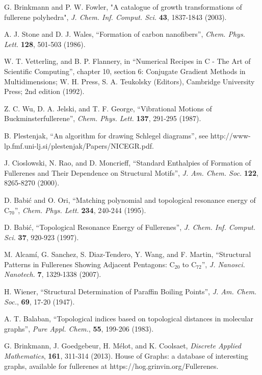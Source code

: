 \documentclass[article,a4paper,twoside]{memoir}
\newcommand{\C}[1]{\ensuremath{\mathrm{C}_{#1}}}
\begin{document}
\begin{thebibliography}{99}
 G. Brinkmann and P. W. Fowler, "A catalogue of growth transformations of fullerene polyhedra",
\textit{J. Chem. Inf. Comput. Sci.} \textbf{43}, 1837-1843 (2003).

 A. J. Stone and D. J. Wales, ``Formation of carbon nanofibers'', \textit{Chem. Phys. Lett.} \textbf{128}, 501-503 (1986).

 W. T. Vetterling, and B. P. Flannery, in ``Numerical Recipes in C - The Art of Scientific Computing'', chapter 10, section 6: Conjugate Gradient Methods in Multidimensions; W. H. Press, S. A. Teukolsky (Editors), Cambridge University Press; 2nd edition (1992).

 Z. C. Wu, D. A. Jelski, and T. F. George, ``Vibrational Motions of
Buckminsterfullerene'', \textit{Chem. Phys. Lett.} \textbf{137}, 291-295 (1987).

 B. Plestenjak, ``An algorithm for drawing Schlegel diagrams'', see http://www-lp.fmf.uni-lj.si/plestenjak/Papers/NICEGR.pdf.

 J. Cioslowski, N. Rao, and D. Moncrieff, ``Standard Enthalpies of Formation of Fullerenes and Their
Dependence on Structural Motifs'', \textit{J. Am. Chem. Soc.} \textbf{122}, 8265-8270 (2000).

 D. Babi\'c and O. Ori, ``Matching polynomial and topological resonance energy of \C{70}'', \textit{Chem. Phys. Lett.} \textbf{234}, 240-244 (1995).

 D. Babi\'c, ``Topological Resonance Energy of Fullerenes'', \textit{J. Chem. Inf. Comput. Sci.} \textbf{37}, 920-923 (1997).

 M. Alcam\'i, G. Sanchez, S. Diaz-Tendero, Y. Wang, and F. Martin, ``Structural Patterns in Fullerenes Showing
Adjacent Pentagons: \C{20} to \C{72}'', \textit{J. Nanosci. Nanotech.} \textbf{7}, 1329-1338 (2007).

 H. Wiener, ``Structural Determination of Paraffin Boiling Points'', \textit{J. Am. Chem. Soc.}, \textbf{69}, 17-20 (1947).

 A. T. Balaban, ``Topological indices based on topological distances in molecular graphs'', \textit{Pure Appl. Chem.}, \textbf{55}, 199-206 (1983).

 G. Brinkmann,  J. Goedgebeur, H. M\'elot, and K. Coolsaet, \textit{Discrete Applied Mathematics}, \textbf{161}, 311-314 (2013). 
House of Graphs: a database of interesting graphs, available for fullerenes at https://hog.grinvin.org/Fullerenes.


\end{thebibliography}
\end{document}
